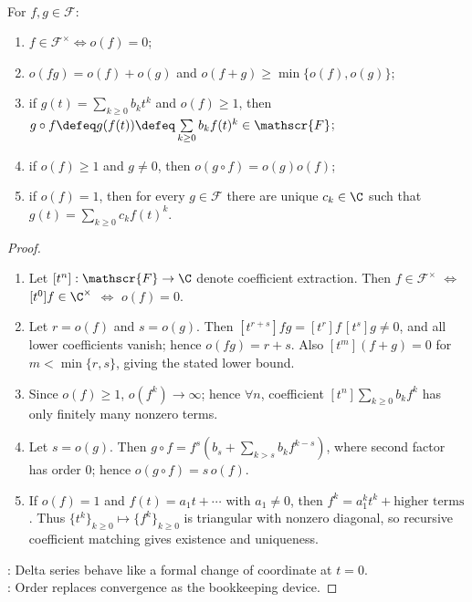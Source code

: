 \begin{proposition} \label{prop:formal-series-order-and-composition} \\
For $f,g\in\mathscr{F}$:
\begin{enumerate}[label=(\roman*)]
\setlength{\itemsep}{0pt}
\item $f\in\mathscr{F}^{\times}\Longleftrightarrow o(f)=0$;
\item $o(fg)=o(f)+o(g)$ and $o(f+g)\geq\min\{o(f),o(g)\}$;
\item if $g(t)=\sum_{k\geq0}b_kt^k$ and $o(f)\geq1$, then
$g\circ f\defeq g(f(t))\defeq\sum\limits_{k\geq0}b_kf(t)^k\in\mathscr{F}$;
\item if $o(f)\geq1$ and $g\neq0$, then $o(g\circ f)=o(g)o(f)$;
\item if $o(f)=1$, then for every $g\in\mathscr{F}$ there are unique $c_k\in\C$ such that $g(t)=\sum\limits_{k\geq0}c_k f(t)^k$.
\end{enumerate}
\begin{proof}
\begin{enumerate}[label=(\roman*)]
\setlength{\itemsep}{0pt}
\item Let $[t^n]:\mathscr{F}\to\C$ denote coefficient extraction. Then $f\in\mathscr{F}^{\times}$ $\Longleftrightarrow$ $[t^0]f\in\C^{\times}$ $\Longleftrightarrow$ $o(f)=0$.
\item Let $r=o(f)$ and $s=o(g)$. Then $[t^{r+s}]fg=[t^r]f\,[t^s]g\neq0$, and all lower coefficients vanish; hence $o(fg)=r+s$. Also $[t^m](f+g)=0$ for $m<\min\{r,s\}$, giving the stated lower bound.
\item Since $o(f)\geq1$, $o(f^k)\to\infty$; hence $\forall n$, coefficient $[t^n]\sum\limits_{k\geq0}b_kf^k$ has only finitely many nonzero terms.
\item Let $s=o(g)$. Then $g\circ f=f^s\left(b_s+\sum\limits_{k>s}b_kf^{k-s}\right)$, where second factor has order $0$; hence $o(g\circ f)=s\,o(f)$.
\item If $o(f)=1$ and $f(t)=a_1t+\cdots$ with $a_1\neq0$, then $f^k=a_1^kt^k+\text{higher terms}$. Thus $\{t^k\}_{k\geq0}\mapsto\{f^k\}_{k\geq0}$ is triangular with nonzero diagonal, so recursive coefficient matching gives existence and uniqueness.
\end{enumerate}
: Delta series behave like a formal change of coordinate at $t=0$.\\
: Order replaces convergence as the bookkeeping device.
\end{proof}
\end{proposition}

